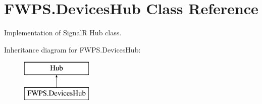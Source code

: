 \hypertarget{class_f_w_p_s_1_1_devices_hub}{}\section{F\+W\+P\+S.\+Devices\+Hub Class Reference}
\label{class_f_w_p_s_1_1_devices_hub}


Implementation of SignalR Hub class.  


Inheritance diagram for F\+W\+P\+S.\+Devices\+Hub\+:\begin{figure}[H]
\begin{center}
\leavevmode
\includegraphics[height=2.000000cm]{class_f_w_p_s_1_1_devices_hub}
\end{center}
\end{figure}
